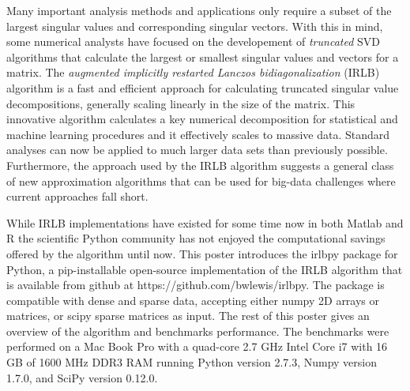 \documentclass[landscape,a0b,final]{a0poster}
\newenvironment{poster}{
  \begin{center}
  \begin{minipage}[c]{0.98\textwidth}
}{
  \end{minipage} 
  \end{center}
}
\newcommand{\pbox}[4]{
\psshadowbox[#3]{
\begin{minipage}[t][#2][t]{#1}
#4
\end{minipage}
}}
\begin{document}
\begin{poster}
\begin{multicols}{3}
\vspace{0.75cm}

Many important analysis methods and applications only require a subset of the
largest singular values and corresponding singular vectors. With this in mind,
some numerical analysts have focused on the developement of {\em truncated} SVD
algorithms that calculate the largest or smallest singular values and vectors
for a matrix.  The {\em augmented implicitly restarted Lanczos
bidiagonalization} (IRLB) algorithm \cite{Baglama2006} is a fast and efficient
approach for calculating truncated singular value decompositions, generally
scaling linearly in the size of the matrix. This innovative algorithm
calculates a key numerical decomposition for statistical and machine learning
procedures and it effectively scales to massive data.  Standard analyses can
now be applied to much larger data sets than previously possible.  Furthermore,
the approach used by the IRLB algorithm suggests a general class of new
approximation algorithms that can be used for big-data challenges where current
approaches fall short.

\vspace{0.75cm}

While IRLB implementations have existed for some time now in both Matlab
\cite{irlbaMatlab} and R \cite{irlbaR} the scientific Python community has not
enjoyed the computational savings offered by the algorithm until now.  This
poster introduces the irlbpy package for Python, a pip-installable open-source
implementation of the IRLB algorithm that is available from github at
https://github.com/bwlewis/irlbpy. The package is compatible with dense and
sparse data, accepting either numpy 2D arrays or matrices, or scipy sparse
matrices as input. The rest of this poster gives an overview of the algorithm
and benchmarks performance.  The benchmarks were performed on a Mac Book Pro
with a quad-core 2.7 GHz Intel Core i7 with 16 GB of 1600 MHz DDR3 RAM running
Python version 2.7.3, Numpy version 1.7.0, and SciPy version 0.12.0.


\vspace{2cm}\begin{center}\pbox{0.8\columnwidth}{}{linewidth=2mm,framearc=0.1,fillstyle=gradient,gradangle=0,gradbegin=white,gradend=white,gradmidpoint=1.0,framesep=1em}{\begin{center}\bf{Partial SVD Definition}\end{center}}\end{center}\vspace{1.25cm}


\end{multicols}
\end{poster}
\end{document}
